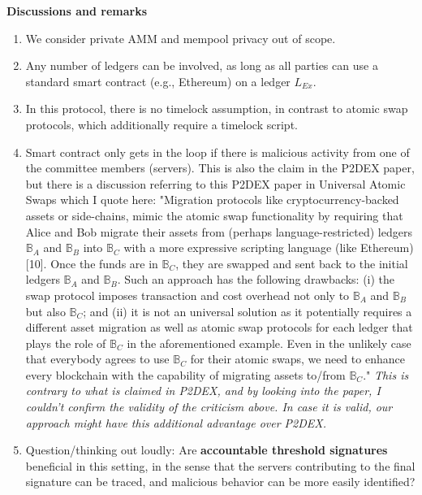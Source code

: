 \noindent \textbf{Discussions and remarks}
\begin{enumerate}
    \item {We consider private AMM and mempool privacy out of scope.}
    \item Any number of ledgers can be involved, as long as all parties can use a standard smart contract (e.g., Ethereum) on a ledger $L_{Ex}$.
    \item In this protocol, there is no timelock assumption, in contrast to atomic swap protocols, which additionally require a timelock script.
    \item Smart contract only gets in the loop if there is malicious activity from one of the committee members (servers). This is also the claim in the P2DEX paper, but there is a discussion referring to this P2DEX paper in Universal Atomic Swaps which I quote here: "Migration protocols like cryptocurrency-backed assets or side-chains, mimic the atomic swap functionality by requiring that Alice and Bob migrate their assets from (perhaps language-restricted) ledgers $\mathbb{B}_A$ and $\mathbb{B}_B$ into $\mathbb{B}_C$ with a more expressive scripting language (like Ethereum) [10]. Once the funds are in $\mathbb{B}_C$, they are swapped and sent back to the initial ledgers $\mathbb{B}_A$ and $\mathbb{B}_B$. Such an approach has the following drawbacks: (i) the swap protocol imposes transaction and cost overhead not only to $\mathbb{B}_A$ and $\mathbb{B}_B$ but also $\mathbb{B}_C$; and (ii) it is not an universal solution as it potentially requires a different asset migration as well as atomic swap protocols for each ledger that plays the role of $\mathbb{B}_C$ in the aforementioned example. Even in the unlikely case that everybody agrees to use $\mathbb{B}_C$ for their atomic swaps, we need to enhance every blockchain with the capability of migrating assets to/from $\mathbb{B}_C$."
    \textit{This is contrary to what is claimed in P2DEX, and by looking into the paper, I couldn't confirm the validity of the criticism above. In case it is valid, our approach might have this additional advantage over P2DEX.}
    \item Question/thinking out loudly: Are \textbf{accountable threshold signatures} beneficial in this setting, in the sense that the servers contributing to the final signature can be traced, and malicious behavior can be more easily identified?
\end{enumerate}
